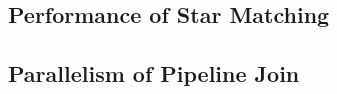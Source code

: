 \subsection{Performance of Star Matching}
\subsection{Parallelism of Pipeline Join}\label{sec:experiments_join}
